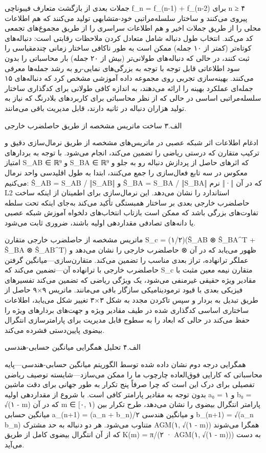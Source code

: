 \documentclass[12pt, a4paper]{article}
\begin{document}
جملات بعدی از بازگشت متعارف فیبوناچی f\_n = f\_(n-1) + f\_(n-2) برای n ≥ ۴ پیروی می‌کنند و ساختار سلسله‌مراتبی خود-متشابهی تولید می‌کنند که هم اطلاعات محلی را از طریق جملات اخیر و هم اطلاعات سراسری را از طریق مجموع‌های تجمعی کد می‌کند. انتخاب طول دنباله شامل متعادل کردن ملاحظات رقابتی است: دنباله‌های کوتاه‌تر (کمتر از ۱۰ جمله) ممکن است به طور ناکافی ساختار زمانی چندمقیاسی را ثبت کنند، در حالی که دنباله‌های طولانی‌تر (بیش از ۲۰ جمله) بار محاسباتی را بدون سود اطلاعاتی قابل توجه با توجه به بزرگی‌های نمایی-رو به رشد جمله‌ها معرفی می‌کنند. بهینه‌سازی تجربی روی مجموعه داده آموزشی مشخص کرد که دنباله‌های ۱۵ جمله‌ای عملکرد بهینه را ارائه می‌دهند، به اندازه کافی طولانی برای کدگذاری ساختار سلسله‌مراتبی اساسی در حالی که از نظر محاسباتی برای کاربردهای بلادرنگ که نیاز به تولید هزاران دنباله در ثانیه دارند، قابل مدیریت باقی می‌مانند.

الف.۳ ساخت ماتریس مشخصه از طریق حاصلضرب خارجی

ادغام اطلاعات اثر شبکه عصبی در ماتریس‌های مشخصه از طریق نرمال‌سازی دقیق و ترکیب متقارن که درستی ریاضی را تضمین می‌کند، انجام می‌شود. با توجه به بردارهای امتیاز S\_AB ∈ ℝ⁹ و S\_BA ∈ ℝ⁹ که اثرهای حاصل از پردازش دنباله رو به جلو و معکوس در سه تابع فعال‌سازی را جمع می‌کنند، ابتدا به طول اقلیدسی واحد نرمال می‌کنیم: Ŝ\_AB = S\_AB / ‖S\_AB‖ و Ŝ\_BA = S\_BA / ‖S\_BA‖ که در آن ‖·‖ نرم L2 استاندارد را نشان می‌دهد. این نرمال‌سازی برای اطمینان از اینکه ساخت حاصلضرب خارجی بعدی بر ساختار همبستگی تأکید می‌کند به‌جای اینکه تحت سلطه تفاوت‌های بزرگی باشد که ممکن است بازتاب انتخاب‌های دلخواه آموزش شبکه عصبی یا دانه‌های تصادفی مقداردهی اولیه باشند، ضروری ثابت می‌شود.

ماتریس مشخصه از حاصلضرب خارجی متقارن S\_c = (۱/۲)(Ŝ\_AB ⊗ Ŝ\_BA\textasciicircum{}T + Ŝ\_BA ⊗ Ŝ\_AB\textasciicircum{}T) ظهور می‌یابد که در آن ⊗ حاصلضرب خارجی را نشان می‌دهد و عملگر ترانهاده، تراز بعدی مناسب را تضمین می‌کند. متقارن‌سازی—میانگین گرفتن حاصلضرب خارجی با ترانهاده آن—تضمین می‌کند که S\_c متقارن نیمه معین مثبت با مقادیر ویژه حقیقی غیرمنفی می‌شود، یک ویژگی ریاضی که تضمین می‌کند تفسیرهای فیزیکی بعدی با قیود ترمودینامیکی سازگار باقی می‌مانند. ماتریس ۹×۹ حاصل از طریق تبدیل به بردار و سپس تاکردن مجدد به شکل ۳×۳ تغییر شکل می‌یابد، اطلاعات ساختاری اساسی کدگذاری شده در طیف مقادیر ویژه و جهت‌های بردارهای ویژه را حفظ می‌کند در حالی که ابعاد را به سطوح قابل مدیریت برای پارامترسازی انتگرال بیضوی پایین‌دستی فشرده می‌کند.

الف.۴ تحلیل همگرایی میانگین حسابی-هندسی

همگرایی درجه دوم نشان داده شده توسط الگوریتم میانگین حسابی-هندسی—پایه محاسباتی که کارایی فوق‌العاده چارچوب ما را ممکن می‌سازد—شایسته توصیف ریاضی تفصیلی برای درک این است که چرا صرفاً پنج تکرار به طور جهانی برای دقت ماشین بدون توجه به مقادیر پارامتر کافی است. با شروع از مقداردهی اولیه a₀ = ۱ و b₀ = √(۱ - m) که در آن m ∈ [۰, ۱) پارامتر انتگرال بیضوی را نشان می‌دهد، طرح تکرار بین میانگین حسابی a\_(n+1) = (a\_n + b\_n)/۲ و میانگین هندسی b\_(n+1) = √(a\_n b\_n) متناوب می‌شود. هر دو دنباله به حد مشترک AGM(۱, √(۱ - m)) همگرا می‌شوند که از آن انتگرال بیضوی کامل از طریق K(m) = π/(۲ · AGM(۱, √(۱ - m))) به دست می‌آید.
\end{document}
